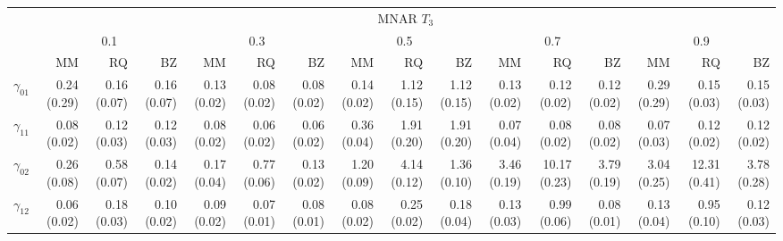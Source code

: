 \documentclass[12pt]{article}
\begin{document}
\begin{landscape}
\begin{table}[h]
  \begin{tabular}{rrrrrrrrrrrrrrrr}
    \toprule
    & \multicolumn{15}{c}{MNAR $T_3$} \\
    \cline{2-16}
    &  \multicolumn{3}{c}{0.1} &  \multicolumn{3}{c}{0.3} &  \multicolumn{3}{c}{0.5} &
    \multicolumn{3}{c}{0.7} &  \multicolumn{3}{c}{0.9} \\
    \cline{2-16}
    & MM   & RQ   & BZ   & MM   & RQ   & BZ   & MM   & RQ   & BZ   & MM   & RQ   & BZ   & MM   & RQ   & BZ   \\
    \hline
    $\gamma_{01}$ &0.24 (0.29) & 0.16 (0.07) & 0.16 (0.07) & 0.13 (0.02) & 0.08 (0.02) & 0.08 (0.02) & 0.14 (0.02) & 1.12 (0.15) & 1.12 (0.15) & 0.13 (0.02) & 0.12 (0.02) & 0.12 (0.02) & 0.29 (0.29) & 0.15 (0.03) & 0.15 (0.03) \\
    $\gamma_{11}$ &0.08 (0.02) & 0.12 (0.03) & 0.12 (0.03) & 0.08 (0.02) & 0.06 (0.02) & 0.06 (0.02) & 0.36 (0.04) & 1.91 (0.20) & 1.91 (0.20) & 0.07 (0.04) & 0.08 (0.02) & 0.08 (0.02) & 0.07 (0.03) & 0.12 (0.02) & 0.12 (0.02) \\
    $\gamma_{02}$ &0.26 (0.08) & 0.58 (0.07) & 0.14 (0.02) & 0.17 (0.04) & 0.77 (0.06) & 0.13 (0.02) & 1.20 (0.09) & 4.14 (0.12) & 1.36 (0.10) & 3.46 (0.19) & 10.17 (0.23) & 3.79 (0.19) & 3.04 (0.25) & 12.31 (0.41) & 3.78 (0.28) \\
    $\gamma_{12}$ &0.06 (0.02) & 0.18 (0.03) & 0.10 (0.02) & 0.09 (0.02) & 0.07 (0.01) & 0.08 (0.01) & 0.08 (0.02) & 0.25 (0.02) & 0.18 (0.04) & 0.13 (0.03) & 0.99 (0.06) & 0.08 (0.01) & 0.13 (0.04) & 0.95 (0.10) & 0.12 (0.03) \\
    \bottomrule
  \end{tabular}


\end{table}
\end{landscape}
\end{document}
